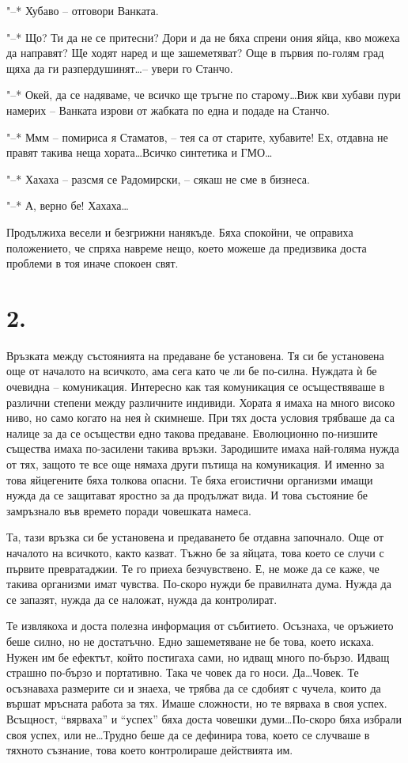 \documentclass[ebook,openany,12pt]{memoir}
\begin{document}
"--* Хубаво – отговори Ванката.

"--* Що? Ти да не се притесни? Дори и да не бяха спрени ония яйца, кво можеха да направят? Ще ходят наред и ще зашеметяват? Още в първия по-голям град щяха да ги разпердушинят\ldots – увери го Станчо.

"--* Окей, да се надяваме, че всичко ще тръгне по старому\ldots Виж кви хубави пури намерих – Ванката изрови от жабката по една и подаде на Станчо.

"--* Ммм -- помириса я Стаматов, – тея са от старите, хубавите! Ех, отдавна не правят такива неща хората\ldots Всичко синтетика и ГМО\ldots

"--* Хахаха – разсмя се Радомирски, – сякаш не сме в бизнеса.

"--* А, верно бе! Хахаха\ldots

Продължиха весели и безгрижни нанякъде. Бяха спокойни, че оправиха положението, че спряха навреме нещо, което можеше да предизвика доста проблеми в тоя иначе спокоен свят. 

\section*{2.}

Връзката между състоянията на предаване бе установена. Тя си бе установена още от началото на всичкото, ама сега като че ли бе по-силна. Нуждата ѝ бе очевидна – комуникация. Интересно как тая комуникация се осъществяваше в различни степени между различните индивиди. Хората я имаха на много високо ниво, но само когато на нея ѝ скимнеше. При тях доста условия трябваше да са налице за да се осъществи едно такова предаване. Еволюционно по-низшите същества имаха по-засилени такива връзки. Зародишите имаха най-голяма нужда от тях, защото те все още нямаха други пътища на комуникация. И именно за това яйцегените бяха толкова опасни. Те бяха егоистични организми имащи нужда да се защитават яростно за да продължат вида. И това състояние бе замръзнало във времето поради човешката намеса.

Та, тази връзка си бе установена и предаването бе отдавна започнало. Още от началото на всичкото, както казват. Тъжно бе за яйцата, това което се случи с първите превратаджии. Те го приеха безчувствено. Е, не може да се каже, че такива организми имат чувства. По-скоро нужди бе правилната дума. Нужда да се запазят, нужда да се наложат, нужда да контролират.

Те извлякоха и доста полезна информация от събитието. Осъзнаха, че оръжието беше силно, но не достатъчно. Едно зашеметяване не бе това, което искаха. Нужен им бе ефектът, който постигаха сами, но идващ много по-бързо. Идващ страшно по-бързо и портативно. Така че човек да го носи. Да\ldots Човек. Те осъзнаваха размерите си и знаеха, че трябва да се сдобият с чучела, които да вършат мръсната работа за тях. Имаше сложности, но те вярваха в своя успех. Всъщност, ``вярваха'' и ``успех'' бяха доста човешки думи\ldots По-скоро бяха избрали своя успех, или не\ldots Трудно беше да се дефинира това, което се случваше в тяхното съзнание, това което контролираше действията им.
\end{document}
